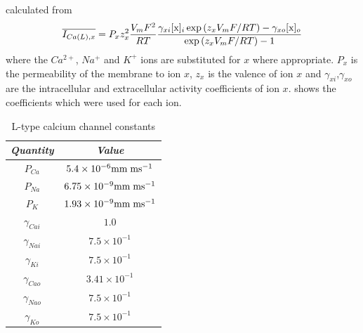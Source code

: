 calculated from 
\begin{equation}
  \label{eqn:lr2_ical_fullyact}
   \overline{I_{Ca\left( L \right),x}}= P_{x}z_{x}^2\dfrac{V_m F^2}{R T}
  \dfrac{\gamma_{xi} [\mathrm{x}]_{i} \exp \left(z_{x} V_m F / R
  T\right) - \gamma_{xo}  [\mathrm{x}]_{o} }{\exp \left(z_{x} V_m F / R
  T\right) - 1}
\end{equation}
where the $Ca^{2+}$, $Na^+$ and $K^+$ ions are substituted for $x$ where
appropriate. $P_x$ is the permeability of the membrane to ion $x$, $z_x$ is
the valence of ion $x$ and $\gamma_{xi}$,$\gamma_{xo}$ are the intracellular
and extracellular activity coefficients of ion
$x$.  shows the 
coefficients which were used for each ion.
\begin{table}[hbtp] \centering
  \begin{tabular}{|c|c|}
    \hline
    \emph{Quantity} & \emph{Value} \\ 
    \hline
    \hline 
      $P_{Ca}$ & $5.4 \times 10^{-6} \mathrm{mm}\thickspace\mathrm{ms}^{-1}$ \\
      $P_{Na}$ & $6.75 \times 10^{-9}\mathrm{mm}\thickspace\mathrm{ms}^{-1}$ \\
      $P_{K}$ & $1.93 \times 10^{-9}\mathrm{mm}\thickspace\mathrm{ms}^{-1}$ \\
      $\gamma_{Cai}$ & $1.0$ \\
      $\gamma_{Nai}$ & $7.5 \times 10^{-1}$ \\
      $\gamma_{Ki}$ & $7.5 \times 10^{-1}$ \\
      $\gamma_{Cao}$ & $3.41 \times 10^{-1}$ \\
      $\gamma_{Nao}$ & $7.5 \times 10^{-1}$ \\
      $\gamma_{Ko}$ & $7.5 \times 10^{-1}$ \\
    \hline
  \end{tabular}
  \caption[L-type calcium channel constants]{L-type calcium channel constants}
  \label{tab:lr2_lca_constants}
\end{table}
%

